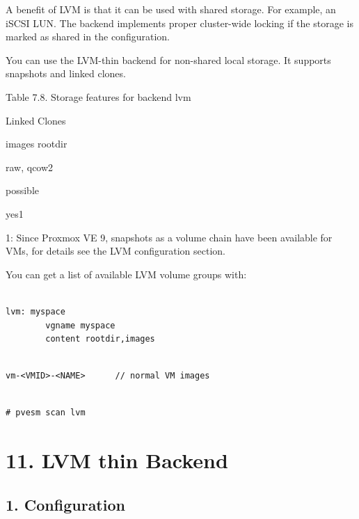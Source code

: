 A benefit of LVM is that it can be used with shared storage. For example, an iSCSI LUN. The backend implements proper cluster-wide locking if the storage is marked as shared in the configuration.

You can use the LVM-thin backend for non-shared local storage. It supports snapshots and linked clones.

Table 7.8. Storage features for backend lvm

Linked Clones

images rootdir

raw, qcow2

possible

yes1

1: Since Proxmox VE 9, snapshots as a volume chain have been available for VMs, for details see the LVM configuration section.

You can get a list of available LVM volume groups with:

\begin{lstlisting}

lvm: myspace
        vgname myspace
        content rootdir,images

\end{lstlisting}

\begin{lstlisting}

vm-<VMID>-<NAME>      // normal VM images

\end{lstlisting}

\begin{lstlisting}

# pvesm scan lvm

\end{lstlisting}

\begin{table}[htbp]

\centering

\begin{tabular}

\end{tabular}

\end{table}


\section{11. LVM thin Backend}

\subsection{1. Configuration}

